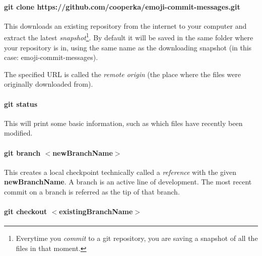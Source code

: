 \documentclass[a4paper, 11pt]{article}
\begin{document}
\paragraph{git clone https://github.com/cooperka/emoji-commit-messages.git}
This downloads an existing repository from the internet to your computer and extract the latest \emph{snapshot}\footnote{Everytime you \emph{commit}\footnotemark{} to a git repository, you are saving a snapshot of all the files in that moment.}. By default it will be saved in the same folder where your repository is in, using the same name as the downloading snapshot (in this case: emoji-commit-messages).

The specified URL is called the \emph{remote origin} (the place where the files were originally downloaded from).

\paragraph{git status}
This will print some basic information, such as which files have recently been modified.

\paragraph{git branch $<$newBranchName$>$}
This creates a local checkpoint technically called a \emph{reference} with the given \textbf{newBranchName}. A branch is an active line of development. The most recent commit on a branch is referred as the tip of that branch.

\paragraph{git checkout $<$existingBranchName$>$}
\end{document}
